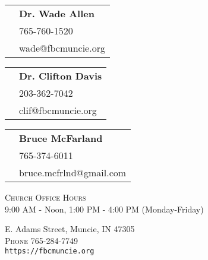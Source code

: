 \documentclass[
notumble,
nofoldmark,
letterpaper,
10pt,
]{leaflet}
\newcommand{\phone}[1]{\small{\faPhone \hspace{.2em} #1}}
\newcommand{\email}[1]{\small{\faEnvelopeO \hspace{.2em} #1}}
\newcommand{\pastor}[4]{
\begin{tabular}{r l}
\textsc{\multirow[t]{3}{8em}{#1}} & \textbf{#2} \\
 & \phone{#3} \\
 & \email{#4} \\
 \end{tabular}
 \newline
\vspace*{2mm}
\newline
}
\begin{document}
\vfill



\vfill

\pastor{Pastor}{Dr. Wade Allen}{765-760-1520}{wade@fbcmuncie.org}
\pastor{Worship Arts Pastor}{Dr. Clifton Davis}{203-362-7042}{clif@fbcmuncie.org}
\pastor{Choir Director}{Bruce McFarland}{765-374-6011}{bruce.mcfrlnd@gmail.com}

\pagebreak



\vfill




\vfill


\centering
\textsc{Church Office Hours} \\
9:00 AM - Noon, 1:00 PM - 4:00 PM (Monday-Friday)

\medskip

 E. Adams Street, Muncie, IN 47305\\
\textsc{Phone} 765-284-7749\\
\texttt{https://fbcmuncie.org}

\loggingall
\end{document}
